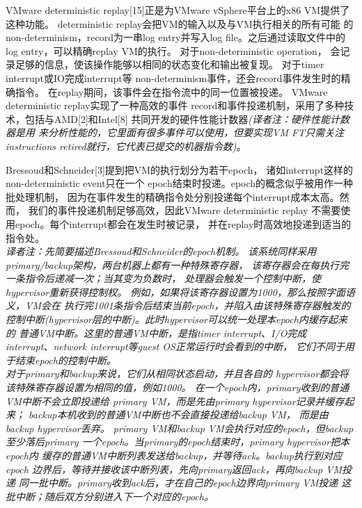 VMware deterministic replay[15]正是为VMware %
vSphere平台上的x86 VM提供了这种功能。%
deterministic replay会把VM的输入以及与VM执行相关的所有可能%
的non-determinism，record为一串log entry并写入log %
file。之后通过读取文件中的log entry，可以精确replay VM的执行。%
对于non-deterministic operation，%
会记录足够的信息，使该操作能够以相同的状态变化和输出被复现。%
对于timer interrupt或IO完成interrupt等%
non-determinism事件，还会record事件发生时的精确指令。%
在replay期间，该事件会在指令流中的同一位置被投递。%
VMware deterministic replay实现了一种高效的事件%
record和事件投递机制，采用了多种技术，包括与AMD[2]和Intel[8]%
共同开发的硬件性能计数器\emph{(译者注：硬件性能计数器是用%
来分析性能的，它里面有很多事件可以使用，但要实现VM FT只需关注%
instructions retired就行，它代表已提交的机器指令数)}。%

Bressoud和Schneider[3]提到把VM的执行划分为若干epoch，%
诸如interrupt这样的non-deterministic event只在一个%
epoch结束时投递。epoch的概念似乎被用作一种批处理机制，%
因为在事件发生的精确指令处分别投递每个interrupt成本太高。然而，%
我们的事件投递机制足够高效，因此VMware deterministic replay%
不需要使用epoch。每个interrupt都会在发生时被记录，%
并在replay时高效地投递到适当的指令处。
\\\emph{译者注：先简要描述Bressoud和Schneider的epoch机制。%
该系统同样采用primary/backup架构，两台机器上都有一种特殊寄存器，%
该寄存器会在每执行完一条指令后递减一次；当其变为负数时，%
处理器会触发一个控制中断，使hypervisor重新获得控制权。%
例如，如果将该寄存器设置为1000，那么按照字面语义，VM会在%
执行完1001条指令后结束当前epoch，并陷入由该特殊寄存器触发的%
控制中断(hypervisor层的中断)。此时hypervisor可以统一处理本epoch内缓存起来的%
普通VM中断。这里的普通VM中断，是指timer interrupt、I/O完成%
interrupt、network interrupt等guest OS正常运行时会看到的中断，%
它们不同于用于结束epoch的控制中断。%
\\对于primary和backup来说，它们从相同状态启动，并且各自的%
hypervisor都会将该特殊寄存器设置为相同的值，例如1000。%
在一个epoch内，primary收到的普通VM中断不会立即投递给%
primary VM，而是先由primary hypervisor记录并缓存起来；%
backup本机收到的普通VM中断也不会直接投递给backup VM，%
而是由backup hypervisor丢弃。%
primary VM和backup VM会执行对应的epoch，但backup至少落后primary%
一个epoch。当primary的epoch结束时，primary hypervisor把本epoch内%
缓存的普通VM中断列表发送给backup，并等待ack。backup执行到对应epoch%
边界后，等待并接收该中断列表，先向primary返回ack，再向backup VM投递%
同一批中断。primary收到ack后，才在自己的epoch边界向primary VM投递%
这批中断；随后双方分别进入下一个对应的epoch。}%


